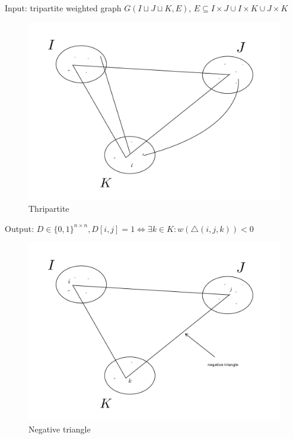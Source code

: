 \begin{df}
	Input: tripartite weighted graph $G(I \sqcup J \sqcup K, E)$, $E \subseteq I \times J \cup I \times K \cup J \times K$
	\begin{figure}[ht]
		\centering
		\includegraphics[scale=0.3]{figures/7.pdf}
		\caption{Thripartite}
	\end{figure}
	Output: $D \in \{0, 1\}^{n \times n}, D[i, j] = 1 \Leftrightarrow \exists k \in K : w(\triangle(i, j, k)) < 0$
	\begin{figure}[ht]
		\centering
		\includegraphics[scale=0.3]{figures/8.pdf}
		\caption{Negative triangle}
	\end{figure}
\end{df}

